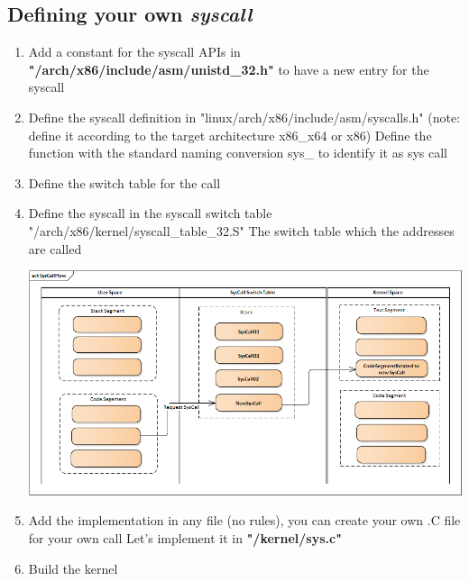 \documentclass{article}
\begin{document}
\subsection{Defining your own \textit{syscall}}
\begin{enumerate}
    \item Add a constant for the syscall APIs in \textbf{"/arch/x86/include/asm/unistd\_32.h"} to have a new entry for the syscall
        
    
    \item Define the syscall definition in "linux/arch/x86/include/asm/syscalls.h" (note: define it according to the target architecture x86\_x64 or x86) 
    Define the function with the standard naming conversion sys\_ to identify it as sys call
    

    \item Define the switch table for the call
    \item Define the syscall in the syscall switch table "/arch/x86/kernel/syscall\_table\_32.S"
    The switch table which the addresses are called
    
    \begin{center}
        \includegraphics[scale=0.60]{./resources/img/new_syscall.PNG}
    \end{center}

    \item Add the implementation in any file (no rules), you can create your own .C file for your own call
    Let's implement it in \textbf{"/kernel/sys.c"}
    

    \item Build the kernel
\end{enumerate}
\end{document}
